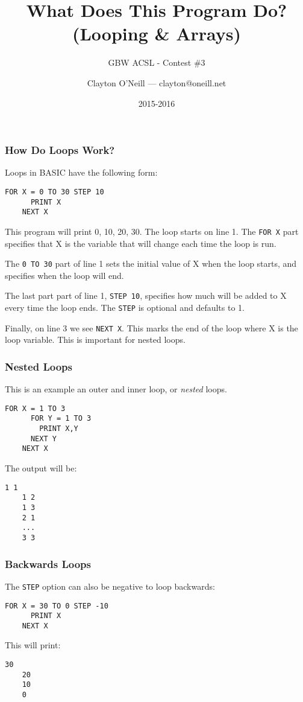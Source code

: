 \documentclass[handout,fleqn, t]{beamer}
\title{What Does This Program Do?\linebreak (Looping \& Arrays)}
\subtitle{GBW ACSL - Contest \#3}
\author{Clayton O'Neill --- clayton@oneill.net}
\date{2015-2016}
\begin{document}
\frame{\titlepage}

\begin{frame}[fragile]
  \frametitle{How Do Loops Work?}
  Loops in BASIC have the following form:

  \begin{lstlisting}[gobble=4]
    FOR X = 0 TO 30 STEP 10
      PRINT X
    NEXT X
  \end{lstlisting}

  This program will print 0, 10, 20, 30.  The loop starts on line 1.  The
  \lstinline{FOR X} part specifies that X is the variable that will change
  each time the loop is run.

  The \lstinline{0 TO 30} part of line 1 sets the initial value of X when the
  loop starts, and specifies when the loop will end.

  The last part part of line 1, \lstinline{STEP 10}, specifies how much will be
  added to X every time the loop ends.  The \lstinline{STEP} is optional and
  defaults to 1.

  Finally, on line 3 we see \lstinline{NEXT X}.  This marks the end of the loop
  where X is the loop variable.  This is important for nested loops.

\end{frame}

\begin{frame}[fragile]
  \frametitle{Nested Loops}

  This is an example an outer and inner loop, or \textit{nested} loops.

  \begin{lstlisting}[gobble=4]
    FOR X = 1 TO 3
      FOR Y = 1 TO 3
        PRINT X,Y
      NEXT Y
    NEXT X
  \end{lstlisting}

  The output will be:
    \begin{lstlisting}[gobble=4]
    1 1
    1 2
    1 3
    2 1
    ...
    3 3
    \end{lstlisting}

\end{frame}

\begin{frame}[fragile]
  \frametitle{Backwards Loops}

  The \lstinline{STEP} option can also be negative to loop backwards:

  \begin{lstlisting}[gobble=4]
    FOR X = 30 TO 0 STEP -10
      PRINT X
    NEXT X
  \end{lstlisting}

  This will print:
  \begin{lstlisting}[gobble=4]
    30
    20
    10
    0
  \end{lstlisting}
\end{frame}
\end{document}
